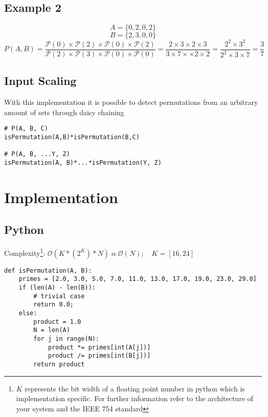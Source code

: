 \documentclass[]{article}
\begin{document}
\subsection*{Example 2}
\begin{equation}
A = \{0, 2, 0, 2\}
\end{equation}
\begin{equation}
B = \{2, 3, 0, 0\}
\end{equation}
\begin{equation}
P(A, B) = \frac{\mathcal{P}(0) \times \mathcal{P}(2) \times \mathcal{P}(0) \times \mathcal{P}(2)}{\mathcal{P}(2) \times \mathcal{P}(3) \times \mathcal{P}(0) \times \mathcal{P}(0)} = \frac{2 \times 3 \times 2 \times 3}{3 \times 7 \times \times 2 \times 2} = \frac{2^{2} \times 3^{2}}{2^{2} \times 3 \times 7} = \frac{3}{7}
\end{equation}


\subsection*{Input Scaling}
With this implementation it is possible to detect permutations from an arbitrary amount of sets through daisy chaining
\begin{lstlisting}
# P(A, B, C)
isPermutation(A,B)*isPermutation(B,C)

# P(A, B, ...Y, Z)
isPermutation(A, B)*...*isPermutation(Y, Z)
\end{lstlisting}

\pagebreak
\section*{Implementation}
\subsection*{Python}
Complexity\footnote{$K$ represents the bit width of a floating point number in python which is implementation specific. For further information refer to the architecture of your system and the IEEE 754 standard}: $\mathcal{O}(K*(2^{K})*N) \;  \alpha \; \mathcal{O}(N);\quad K=[16, 24]$
\begin{lstlisting}
def isPermutation(A, B):
	primes = [2.0, 3.0, 5.0, 7.0, 11.0, 13.0, 17.0, 19.0, 23.0, 29.0]
	if (len(A) - len(B)):
		# trivial case
		return 0.0;
	else:
		product = 1.0
		N = len(A)
		for j in range(N):
			product *= primes[int(A[j])]
			product /= primes[int(B[j])]
		return product
\end{lstlisting}
\end{document}
